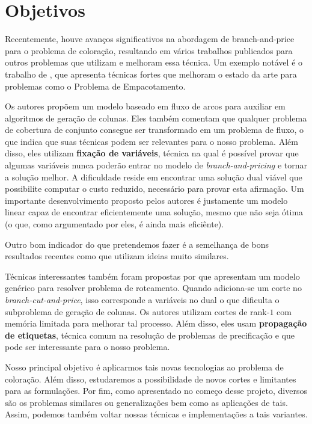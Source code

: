\documentclass[10pt]{article}
\begin{document}
\section{Objetivos}
\label{sec:org75d20d4}
Recentemente, houve avanços significativos na abordagem de branch-and-price para o problema de coloração, resultando em vários trabalhos publicados para outros problemas que utilizam e melhoram essa técnica. Um exemplo notável é o trabalho de \textcite{Lima2022Exactsolutionnetwork}, que apresenta técnicas fortes que melhoram o estado da arte para problemas como o Problema de Empacotamento.

Os autores propõem um modelo baseado em fluxo de arcos para auxiliar em algoritmos de geração de colunas.
Eles também comentam que qualquer problema de cobertura de conjunto consegue ser transformado em um problema de fluxo, o que indica que suas técnicas podem ser relevantes para o nosso problema.
Além disso, eles utilizam \textbf{fixação de variáveis}, técnica na qual é possível provar que algumas variáveis nunca poderão entrar no modelo de \emph{branch-and-pricing} e tornar a solução melhor.
A dificuldade reside em encontrar uma solução dual viável que possibilite computar o custo reduzido, necessário para provar esta afirmação.
Um importante desenvolvimento proposto pelos autores é justamente um modelo linear capaz de encontrar eficientemente uma solução, mesmo que não seja ótima (o que, como argumentado por eles, é ainda mais eficiênte).

Outro bom indicador do que pretendemos fazer é a semelhança de bons resultados recentes como \autocite{Hoeve2021Graphcoloringdecision} que utilizam ideias muito similares.

Técnicas interessantes também foram propostas por \textcite{Pessoa2021SolvingBinPacking} que apresentam um modelo genérico para resolver problema de roteamento.
Quando adiciona-se um corte no \emph{branch-cut-and-price}, isso corresponde a variáveis no dual o que dificulta o subproblema de geração de colunas.
Os autores utilizam cortes de rank-\(1\) com memória limitada para melhorar tal processo.
Além disso, eles usam \textbf{propagação de etiquetas}, técnica comum na resolução de problemas de precificação e que pode ser interessante para o nosso problema.

Nosso principal objetivo é aplicarmos tais novas tecnologias ao problema de coloração.
Além disso, estudaremos a possibilidade de novos cortes e limitantes para as formulações.
Por fim, como apresentado no começo desse projeto, diversos são os problemas similares ou generalizações bem como as aplicações de tais.
Assim, podemos também voltar nossas técnicas e implementações a tais variantes.
\end{document}
